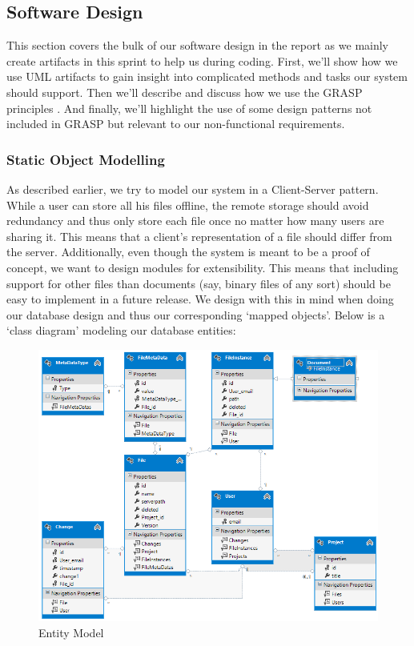 \subsection{Software Design}
This section covers the bulk of our software design in the report as we mainly create artifacts in this sprint to help us during coding. First, we'll show how we use UML artifacts to gain insight into complicated methods and tasks our system should support. Then we'll describe and discuss how we use the GRASP principles \cite[p.~271, p.~413]{OOAD}. And finally, we'll highlight the use of some design patterns not included in GRASP but relevant to our non-functional requirements.
\subsubsection{Static Object Modelling}
As described earlier, we try to model our system in a Client-Server pattern. While a user can store all his files offline, the remote storage should avoid redundancy and thus only store each file once no matter how many users are sharing it. This means that a client's representation of a file should differ from the server. Additionally, even though the system is meant to be a proof of concept, we want to design modules for extensibility. This means that including support for other files than documents (say, binary files of any sort) should be easy to implement in a future release. We design with this in mind when doing our database design and thus our corresponding ‘mapped objects'. Below is a ‘class diagram' modeling our database entities:\\
\begin{figure}[h]
  \includegraphics[width=\textwidth,natwidth=793,natheight=635]{illustrations/entitymodel.png}
  \caption{Entity Model}
  \label{entitymodel2}
\end{figure}
